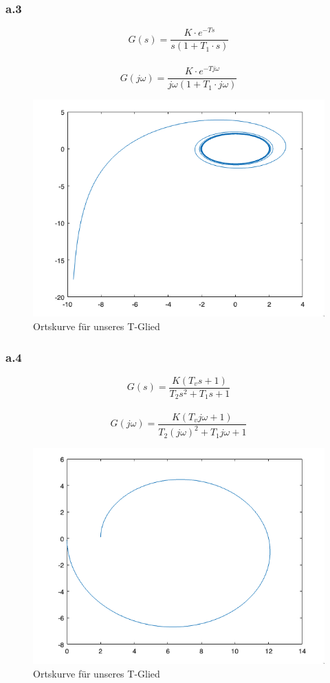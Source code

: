 \documentclass{article}
\begin{document}
			\subsubsection{a.3}
				$$G(s) = \frac{K\cdot e^{-Ts}}{s(1+T_1\cdot s)}$$
				\\
				$$G(j\omega) = \frac{K\cdot e^{-Tj\omega}}{j\omega(1+T_1\cdot j\omega)}$$ 
				\begin{figure}[h]
					\includegraphics[scale = 0.7, center]{./Ortskurve_3_3.png}
					\caption{Ortskurve für unseres T-Glied}
					\label{fig3: Ortskurve}
				\end{figure}
\newpage
			\subsubsection{a.4}
				$$G(s) = \frac{K(T_vs+1)}{T_2s^2 + T_1s + 1}$$
				\\
				$$G(j\omega) = \frac{K(T_vj\omega + 1)}{T_2(j\omega)^2 + T_1j\omega + 1}$$
				\begin{figure}[h]
					\includegraphics[scale = 0.7, center]{./Ortskurve_3_4.png}
					\caption{Ortskurve für unseres T-Glied}
					\label{fig3: Ortskurve}
				\end{figure}
\newpage
\end{document}
